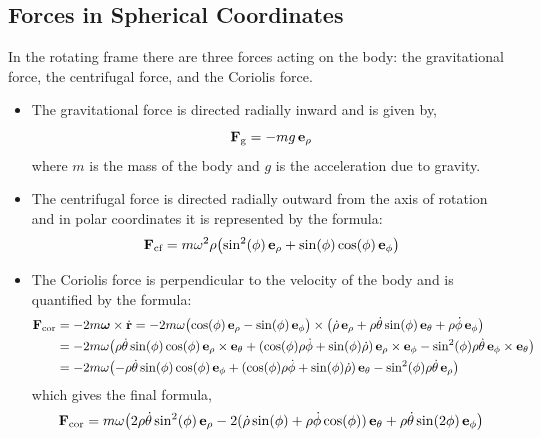 \documentclass[12pt]{article}
\begin{document}
\subsection{Forces in Spherical Coordinates}

In the rotating frame there are three forces acting on the body: the gravitational force, the
centrifugal force, and the Coriolis force.

\begin{itemize}
  \item The gravitational force is directed radially inward and is given by,
  \begin{equation}
    \vb{F}_\text{g} = -mg\,\vb{e}_\rho
  \end{equation}
  where $m$ is the mass of the body and $g$ is the acceleration due to gravity.

  \item The centrifugal force is directed radially outward from the axis of rotation and in
        polar coordinates it is represented by the formula:
  \begin{equation}
    \vb{F}_\text{cf} = m\omega^2\rho\bigl(\sin^2(\phi)\,\vb{e}_\rho
      + \sin(\phi)\cos(\phi)\,\vb{e}_\phi\bigr)
    \label{earth:centrifugal-force-spherical}
  \end{equation}

  \item The Coriolis force is perpendicular to the velocity of the body and is quantified by
        the formula:
  \begin{align}
    \vb{F}_\text{cor}
    &= -2m\boldsymbol{\omega}\times\dot{\vb{r}}
     = -2m\omega\bigl(\cos(\phi)\,\vb{e}_\rho - \sin(\phi)\,\vb{e}_\phi\bigr)
       \times\bigl(\dot\rho\,\vb{e}_\rho + \rho\dot\theta\sin(\phi)\,\vb{e}_\theta + \rho\dot\phi\,\vb{e}_\phi\bigr) \nonumber \\
    &= -2m\omega\bigl(\rho\dot\theta\sin(\phi)\cos(\phi)\,\vb{e}_\rho\times\vb{e}_\theta
       + (\cos(\phi)\rho\dot\phi + \sin(\phi)\dot\rho)\,\vb{e}_\rho\times\vb{e}_\phi
       - \sin^2(\phi)\rho\dot\theta\,\vb{e}_\phi\times\vb{e}_\theta\bigr) \nonumber \\
    &= -2m\omega\bigl(-\rho\dot\theta\sin(\phi)\cos(\phi)\,\vb{e}_\phi
       + (\cos(\phi)\rho\dot\phi + \sin(\phi)\dot\rho)\,\vb{e}_\theta
       - \sin^2(\phi)\rho\dot\theta\,\vb{e}_\rho\bigr)
  \end{align}
  which gives the final formula,
  \begin{equation}
    \vb{F}_\text{cor} = m\omega\bigl(
      2\rho\dot\theta\sin^2(\phi)\,\vb{e}_\rho
      - 2(\dot\rho\sin(\phi) + \rho\dot\phi\cos(\phi))\,\vb{e}_\theta
      + \rho\dot\theta\sin(2\phi)\,\vb{e}_\phi\bigr)
    \label{earth:coriolis-force-spherical}
  \end{equation}
\end{itemize}
\end{document}
